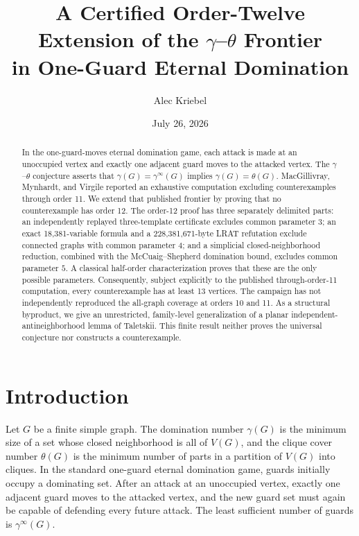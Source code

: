 \documentclass[11pt]{article}
\title{A Certified Order-Twelve Extension of the
\texorpdfstring{$\gamma$--$\theta$}{gamma--theta} Frontier\\
in One-Guard Eternal Domination}
\author{Alec Kriebel}
\date{July 26, 2026}
\theoremstyle{definition}
\theoremstyle{remark}
\newcommand{\gaminf}{\gamma^{\infty}}
\newcommand{\V}{V}
\begin{document}
\maketitle

\begin{abstract}
In the one-guard-moves eternal domination game, each attack is made at an
unoccupied vertex and exactly one adjacent guard moves to the attacked
vertex.  The $\gamma$--$\theta$ conjecture asserts that
\(\gamma(G)=\gaminf(G)\) implies \(\gamma(G)=\theta(G)\).
MacGillivray, Mynhardt, and Virgile reported an exhaustive computation
excluding counterexamples through order 11.  We extend that published
frontier by proving that no counterexample has order 12.  The order-12
proof has three separately delimited parts: an independently replayed
three-template certificate excludes common parameter \(3\); an exact
18,381-variable formula and a 228,381,671-byte LRAT refutation exclude
connected graphs with common parameter \(4\); and a simplicial
closed-neighborhood reduction, combined with the McCuaig--Shepherd
domination bound, excludes common parameter \(5\).  A classical half-order
characterization proves that these are the only possible parameters.
Consequently, subject explicitly to the published through-order-11
computation, every counterexample has at least 13 vertices.  The campaign
has not independently reproduced the all-graph coverage at orders 10 and
11.  As a structural byproduct, we give an unrestricted, family-level
generalization of a planar independent-antineighborhood lemma of Taletskii.
This finite result neither proves the universal conjecture nor constructs a
counterexample.
\end{abstract}

\section{Introduction}\label{sec:intro}

Let \(G\) be a finite simple graph.  The domination number \(\gamma(G)\)
is the minimum size of a set whose closed neighborhood is all of
\(\V(G)\), and the clique cover number \(\theta(G)\) is the minimum number
of parts in a partition of \(\V(G)\) into cliques.  In the standard
one-guard eternal domination game, guards initially occupy a dominating
set.  After an attack at an unoccupied vertex, exactly one adjacent guard
moves to the attacked vertex, and the new guard set must again be capable
of defending every future attack.  The least sufficient number of guards
is \(\gaminf(G)\).
\end{document}
